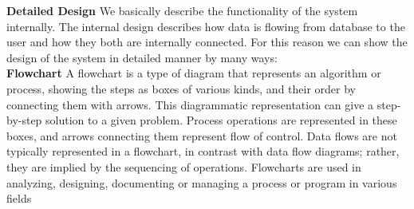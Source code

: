  {\centering \bf Detailed Design}
We basically describe the functionality of the system internally. The internal design describes how data is
flowing from database to the user and how they both are internally connected. For this reason we can show
the design of the system in detailed manner by many ways:\\
{\bf Flowchart } A flowchart is a type of diagram that represents an algorithm or process, showing the steps as boxes of various kinds, and their order by connecting them with arrows. This diagrammatic representation can give a step-by-step solution to a given problem. Process operations are represented in these boxes, and arrows connecting them represent flow of control. Data flows are not typically represented in a flowchart, in contrast with data flow diagrams; rather, they are implied by the sequencing of operations. Flowcharts are used in analyzing, designing, documenting or managing a process or program in various fields



